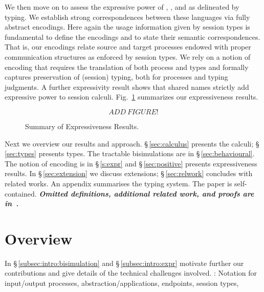We then move on to 
assess the expressive 
power of \HOp, \HO, and \sessp as delineated by typing. 
We establish strong correspondences between 
these languages via fully abstract encodings. 
Here again the usage information given by session types is fundamental to define the encodings
and to state their semantic correspondences.
That is, our encodings relate source and target processes
endowed with proper communication structures as enforced by session types. 
We rely on a notion of encoding that 
requires the translation of both process and types and 
formally captures preservation of (session) typing,
both for processes and typing judgments. 
A further expressivity result shows that 
shared names
 strictly add expressive power 
to session calculi. 
Fig.~\ref{fig:express} summarizes our expressiveness results.

\begin{figure}[t]
\[
ADD~FIGURE!
\]
\caption{Summary of Expressiveness Results. \label{fig:express}}
\Hline
\end{figure}

\smallskip

Next  we overview our results and approach.
\noi \S\,\ref{sec:calculus} presents the calculi; 
\S\,\ref{sec:types} presents types.
The tractable bisimulations are in \S\,\ref{sec:behavioural}.
The notion of encoding is in \S\,\ref{s:expr} and
\S\,\ref{sec:positive} %
presents expressiveness results.
In \S\,\ref{sec:extension} we discuss extensions; 
\S\,\ref{sec:relwork} concludes with related works.
An appendix summarises the typing system. 
The paper is self-contained. 
{\bf\em Omitted definitions, additional related work, and  proofs 
are 
in~\cite{KouzapasPY15}.} 

\section{Overview}
\label{sec:overview}
\noi
In  \S\,\ref{subsec:intro:bisimulation}
and
\S\,\ref{subsec:intro:expr}
motivate further our contributions and 
give details of the technical challenges involved. 
: Notation for input/output processes, abstraction/applications, endpoints, 
session types, 

